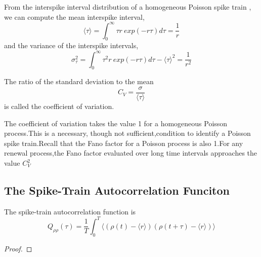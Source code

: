 \begin{thm}
    From the interspike interval distribution of a homogeneous Poisson spike train , we can compute the mean interspike interval,
    \begin{equation}
        \langle \tau \rangle =\int^{\infty}_{0}\tau r\ exp(-r\tau)d\tau  = \frac{1}{r}
        \label{eq:1.32}         
    \end{equation}
    and the variance of the interspike intervals,
    \begin{equation}
        \sigma^2_\tau =\int^{\infty}_{0}\tau^2 r\ exp(-r\tau)d\tau - \langle \tau \rangle^2 = \frac{1}{r^2}
        \label{eq:1.33}         
    \end{equation}
\end{thm}

\begin{defn}
    The ratio of the standard deviation to the mean
    \begin{equation}
        C_V=\frac{\sigma}{\langle \tau  \rangle}
        \label{eq:1.34}
    \end{equation} is called the coefficient of variation.
\end{defn}

\begin{rem}
    The coefficient of variation takes the value 1 for a homogeneous Poisson process.This is a necessary, though not sufficient,condition to identify a Poisson spike train.Recall that the Fano factor for a Poisson process is also 1.For any renewal process,the Fano factor evaluated over long time intervals approaches the value $C^2_V$
\end{rem}

\subsection{The Spike-Train Autocorrelation Funciton}

\begin{lem}
    The spike-train autocorrelation function is 
    \begin{equation}
        Q_{\rho\rho}(\tau)=\frac{1}{T}\int^T_0 \langle (\rho(t)-\langle r \rangle)(\rho(t+\tau)-\langle r\rangle)\rangle
        \label{eq:1.35}
    \end{equation}
    \begin{proof}
    \end{proof}
\end{lem}
    

